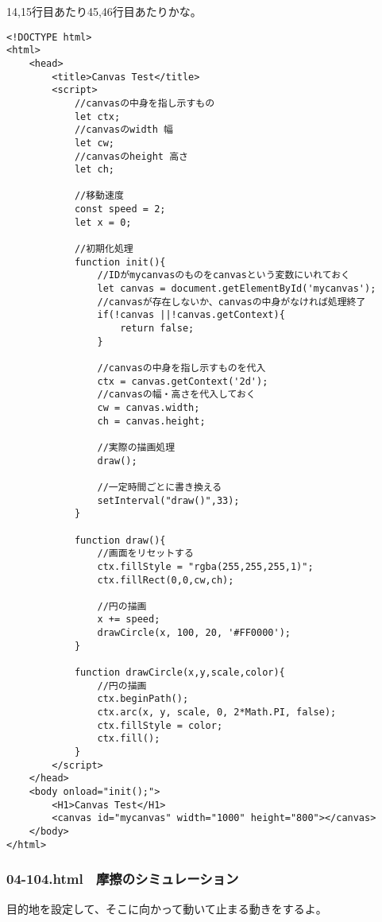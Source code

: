 \documentclass[mingoth,11pt,a4j,uplatex]{jsarticle}
\begin{document}
14,15行目あたり45,46行目あたりかな。
\begin{lstlisting}[caption=等速度運動]
<!DOCTYPE html>
<html>
	<head>
		<title>Canvas Test</title>
		<script>
			//canvasの中身を指し示すもの
			let ctx;
			//canvasのwidth 幅
			let cw;
			//canvasのheight 高さ
			let ch;
			
			//移動速度
			const speed = 2;
			let x = 0;
			
			//初期化処理
			function init(){
				//IDがmycanvasのものをcanvasという変数にいれておく
				let canvas = document.getElementById('mycanvas');
				//canvasが存在しないか、canvasの中身がなければ処理終了
				if(!canvas ||!canvas.getContext){
					return false;
				}
				
				//canvasの中身を指し示すものを代入
				ctx = canvas.getContext('2d');
				//canvasの幅・高さを代入しておく
				cw = canvas.width;
				ch = canvas.height;
				
				//実際の描画処理
				draw();
				
				//一定時間ごとに書き換える
				setInterval("draw()",33);
			}
			
			function draw(){
				//画面をリセットする
				ctx.fillStyle = "rgba(255,255,255,1)";
				ctx.fillRect(0,0,cw,ch);
				
				//円の描画
				x += speed;
				drawCircle(x, 100, 20, '#FF0000');
			}
			
			function drawCircle(x,y,scale,color){
				//円の描画
				ctx.beginPath();
				ctx.arc(x, y, scale, 0, 2*Math.PI, false);
				ctx.fillStyle = color;
				ctx.fill();
			}
		</script>
	</head>
	<body onload="init();">
		<H1>Canvas Test</H1>
		<canvas id="mycanvas" width="1000" height="800"></canvas>
	</body>
</html>
\end{lstlisting}

\subsubsection{04-104.html　摩擦のシミュレーション}
目的地を設定して、そこに向かって動いて止まる動きをするよ。
\end{document}
